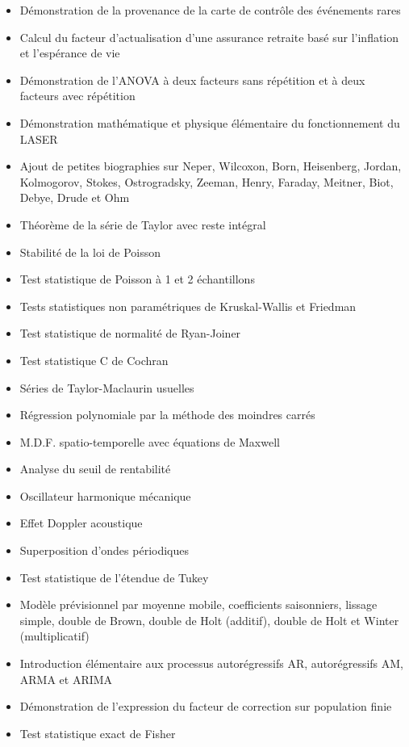 \documentclass[12pt,a4paper,twoside,openright]{report}
\theoremstyle{definition}
\theoremstyle{itexmp}
\numberwithin{equation}{section}
\begin{document}
\begin{itemize}
\begin{itemize}[noitemsep]
				\item Démonstration de la provenance de la carte de contrôle des événements rares
				\item Calcul du facteur d'actualisation d'une assurance retraite basé sur l'inflation et l'espérance de vie
				\item Démonstration de l'ANOVA à deux facteurs sans répétition et à deux facteurs avec répétition
				\item Démonstration mathématique et physique élémentaire du fonctionnement du LASER
				\item Ajout de petites biographies sur Neper, Wilcoxon, Born, Heisenberg, Jordan, Kolmogorov, Stokes, Ostrogradsky, Zeeman, Henry, Faraday,  Meitner, Biot, Debye, Drude et Ohm
				\item Théorème de la série de Taylor avec reste intégral
				\item Stabilité de la loi de Poisson
				\item Test statistique de Poisson à 1 et 2 échantillons
				\item Tests statistiques non paramétriques de Kruskal-Wallis et Friedman
				\item Test statistique de normalité de Ryan-Joiner
				\item Test statistique C de Cochran
				\item Séries de Taylor-Maclaurin usuelles
				\item Régression polynomiale par la méthode des moindres carrés
				\item M.D.F. spatio-temporelle avec équations de Maxwell
				\item Analyse du seuil de rentabilité
				\item Oscillateur harmonique mécanique
				\item Effet Doppler acoustique
				\item Superposition d'ondes périodiques
				\item Test statistique de l'étendue de Tukey
				\item Modèle prévisionnel par moyenne mobile, coefficients saisonniers, lissage simple, double de Brown, double de Holt (additif), double de Holt et Winter (multiplicatif)
				\item Introduction élémentaire aux processus autorégressifs AR, autorégressifs AM, ARMA et ARIMA
				\item Démonstration de l'expression du facteur de correction sur population finie
				\item Test statistique exact de Fisher

\end{itemize}
\end{itemize}
\end{document}
